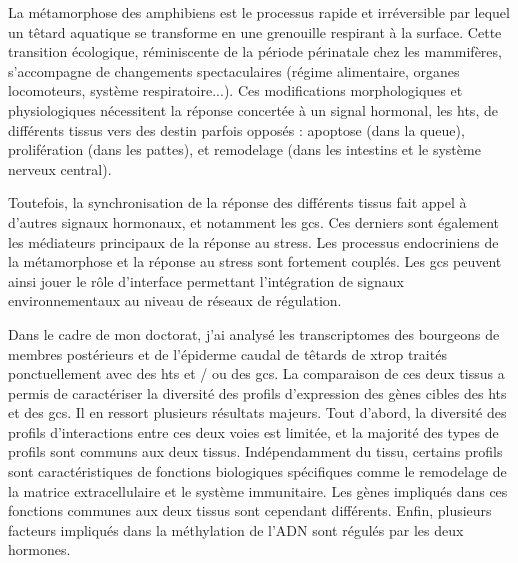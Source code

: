 % 
% 
%
La métamorphose des amphibiens est le processus rapide et irréversible par lequel un têtard aquatique se transforme en une grenouille respirant à la surface.
Cette transition écologique, réminiscente de la période périnatale chez les mammifères, s'accompagne de changements spectaculaires (régime alimentaire, organes locomoteurs, système respiratoire...).
Ces modifications morphologiques et physiologiques nécessitent la réponse concertée à un signal hormonal, les \glspl{ht}, de différents tissus vers des destin parfois opposés :
apoptose (dans la queue), prolifération (dans les pattes), et remodelage (dans les intestins et le système nerveux central).
\par
Toutefois, la synchronisation de la réponse des différents tissus fait appel à d'autres signaux hormonaux, et notamment les \glspl{gc}.
Ces derniers sont également les médiateurs principaux de la réponse au stress.
Les processus endocriniens de la métamorphose et la réponse au stress sont fortement couplés.
Les \glspl{gc} peuvent ainsi jouer le rôle d'interface permettant l'intégration de signaux environnementaux au niveau de réseaux de régulation.
\par
Dans le cadre de mon doctorat, j'ai analysé les transcriptomes des bourgeons de membres postérieurs et de l'épiderme caudal de têtards de \gls{xtrop} traités ponctuellement avec des \glspl{ht} et / ou des \glspl{gc}.
La comparaison de ces deux tissus a permis de caractériser la diversité des profils d'expression des gènes cibles des \glspl{ht} et des \glspl{gc}.
Il en ressort plusieurs résultats majeurs.
Tout d'abord, la diversité des profils d'interactions entre ces deux voies est limitée, et la majorité des types de profils sont communs aux deux tissus.
Indépendamment du tissu, certains profils sont caractéristiques de fonctions biologiques spécifiques comme le remodelage de la matrice extracellulaire et le système immunitaire.
Les gènes impliqués dans ces fonctions communes aux deux tissus sont cependant différents.
Enfin, plusieurs facteurs impliqués dans la méthylation de l'ADN sont régulés par les deux hormones.